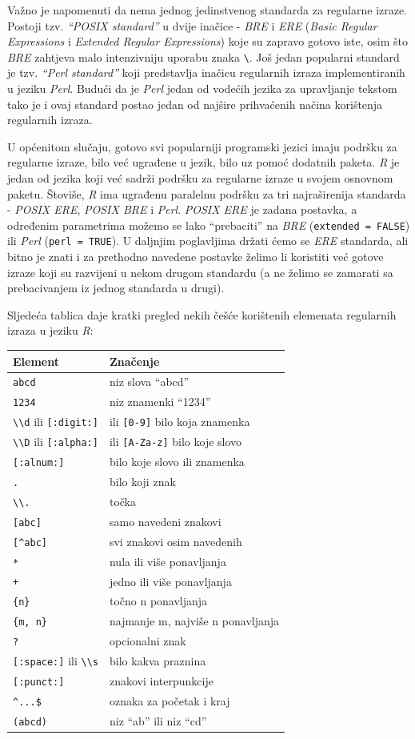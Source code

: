 \documentclass[]{book}
\theoremstyle{definition}
\theoremstyle{definition}
\theoremstyle{definition}
\theoremstyle{remark}
\begin{document}
Važno je napomenuti da nema jednog jedinstvenog standarda za regularne
izraze. Postoji tzv. \emph{``POSIX standard''} u dvije inačice -
\emph{BRE} i \emph{ERE} (\emph{Basic Regular Expressions} i
\emph{Extended Regular Expressions}) koje su zapravo gotovo iste, osim
što \emph{BRE} zahtjeva malo intenzivniju uporabu znaka
\texttt{\textbackslash{}}. Još jedan popularni standard je tzv.
\emph{``Perl standard''} koji predstavlja inačicu regularnih izraza
implementiranih u jeziku \emph{Perl}. Budući da je \emph{Perl} jedan od
vodećih jezika za upravljanje tekstom tako je i ovaj standard postao
jedan od najšire prihvaćenih načina korištenja regularnih izraza.

U općenitom slučaju, gotovo svi popularniji programski jezici imaju
podršku za regularne izraze, bilo već ugrađene u jezik, bilo uz pomoć
dodatnih paketa. \emph{R} je jedan od jezika koji već sadrži podršku za
regularne izraze u svojem osnovnom paketu. Štoviše, \emph{R} ima
ugrađenu paralelnu podršku za tri najraširenija standarda - \emph{POSIX
ERE}, \emph{POSIX BRE} i \emph{Perl}. \emph{POSIX ERE} je zadana
postavka, a određenim parametrima možemo se lako ``prebaciti'' na
\emph{BRE} (\texttt{extended\ =\ FALSE}) ili \emph{Perl}
(\texttt{perl\ =\ TRUE}). U daljnjim poglavljima držati ćemo se
\emph{ERE} standarda, ali bitno je znati i za prethodno navedene
postavke želimo li koristiti već gotove izraze koji su razvijeni u nekom
drugom standardu (a ne želimo se zamarati sa prebacivanjem iz jednog
standarda u drugi).

Sljedeća tablica daje kratki pregled nekih češće korištenih elemenata
regularnih izraza u jeziku \emph{R}:

\begin{longtable}[]{@{}ll@{}}
\toprule
Element & Značenje\tabularnewline
\midrule
\endhead
\texttt{abcd} & niz slova ``abcd''\tabularnewline
\texttt{1234} & niz znamenki ``1234''\tabularnewline
\texttt{\textbackslash{}\textbackslash{}d} ili \texttt{{[}:digit:{]}} &
ili \texttt{{[}0-9{]}} bilo koja znamenka\tabularnewline
\texttt{\textbackslash{}\textbackslash{}D} ili \texttt{{[}:alpha:{]}} &
ili \texttt{{[}A-Za-z{]}} bilo koje slovo\tabularnewline
\texttt{{[}:alnum:{]}} & bilo koje slovo ili znamenka\tabularnewline
\texttt{.} & bilo koji znak\tabularnewline
\texttt{\textbackslash{}\textbackslash{}.} & točka\tabularnewline
\texttt{{[}abc{]}} & samo navedeni znakovi\tabularnewline
\texttt{{[}\^{}abc{]}} & svi znakovi osim navedenih\tabularnewline
\texttt{*} & nula ili više ponavljanja\tabularnewline
\texttt{+} & jedno ili više ponavljanja\tabularnewline
\texttt{\{n\}} & točno n ponavljanja\tabularnewline
\texttt{\{m,\ n\}} & najmanje m, najviše n ponavljanja\tabularnewline
\texttt{?} & opcionalni znak\tabularnewline
\texttt{{[}:space:{]}} ili \texttt{\textbackslash{}\textbackslash{}s} &
bilo kakva praznina\tabularnewline
\texttt{{[}:punct:{]}} & znakovi interpunkcije\tabularnewline
\texttt{\^{}...\$} & oznaka za početak i kraj\tabularnewline
\texttt{(ab\textbar{}cd)} & niz ``ab'' ili niz ``cd''\tabularnewline
\bottomrule
\end{longtable}
\end{document}
